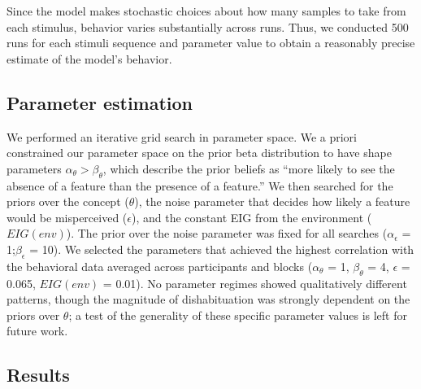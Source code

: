 \documentclass[10pt, letterpaper]{article}
\begin{document}
Since the model makes stochastic choices about how many samples to take
from each stimulus, behavior varies substantially across runs. Thus, we
conducted 500 runs for each stimuli sequence and parameter value to
obtain a reasonably precise estimate of the model's behavior.

\hypertarget{parameter-estimation}{%
\subsection{Parameter estimation}\label{parameter-estimation}}

We performed an iterative grid search in parameter space. We a priori
constrained our parameter space on the prior beta distribution to have
shape parameters \(\alpha_{\theta} > \beta_{\theta}\), which describe
the prior beliefs as ``more likely to see the absence of a feature than
the presence of a feature.'' We then searched for the priors over the
concept (\(\theta\)), the noise parameter that decides how likely a
feature would be misperceived (\(\epsilon\)), and the constant EIG from
the environment (\(EIG(env)\)). The prior over the noise parameter was
fixed for all searches (\(\alpha_{\epsilon}\) = 1;\(\beta_{\epsilon}\) =
10). We selected the parameters that achieved the highest correlation
with the behavioral data averaged across participants and blocks
(\(\alpha_{\theta}\) = 1, \(\beta_{\theta}\) = 4, \(\epsilon\) = 0.065,
\(EIG(env)\) = 0.01). No parameter regimes showed qualitatively
different patterns, though the magnitude of dishabituation was strongly
dependent on the priors over \(\theta\); a test of the generality of
these specific parameter values is left for future work.

\hypertarget{results-1}{%
\subsection{Results}\label{results-1}}
\end{document}
